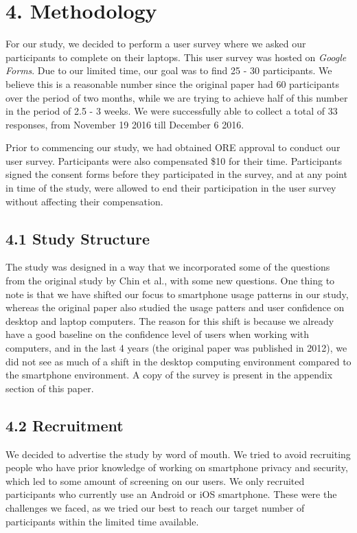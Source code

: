 \documentclass{sigchi}
\begin{document}
\section{4. Methodology}
For our study, we decided to perform a user survey where we asked our participants to complete on their laptops. This user survey was hosted on \textit{Google Forms}. Due to our limited time, our goal was to find 25 - 30 participants. We believe this is a reasonable number since the original paper had 60 participants over the period of two months, while we are trying to achieve half of this number in the period of 2.5 - 3 weeks. We were successfully able to collect a total of 33 responses, from November 19 2016 till December 6 2016.

Prior to commencing our study, we had obtained ORE approval to conduct our user survey. Participants were also compensated \$10 for their time. Participants signed the consent forms before they participated in the survey, and at any point in time of the study, were allowed to end their participation in the user survey without affecting their compensation.
\subsection{4.1 Study Structure}
The study was designed in a way that we incorporated some of the questions from the original study by Chin et al., with some new questions. One thing to note is that we have shifted our focus to smartphone usage patterns  in our study, whereas the original paper also studied the usage patters and user confidence on desktop and laptop computers. The reason for this shift is because we already have a good baseline on the confidence level of users when working with computers, and in the last 4 years (the original paper was published in 2012), we did not see as much of a shift in the desktop computing environment compared to the smartphone environment. A copy of the survey is present in the appendix section of this paper.

\subsection{4.2 Recruitment}

We decided to advertise the study by word of mouth. We tried to avoid recruiting people who have prior knowledge of working on smartphone privacy and security, which led to some amount of screening on our users. We only recruited participants who currently use an Android or iOS smartphone. These were the challenges we faced, as we tried our best to reach our target number of participants within the limited time available.
\end{document}
